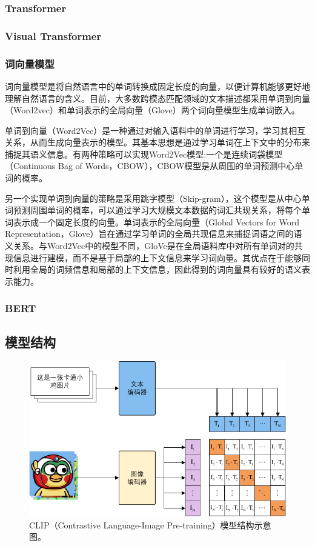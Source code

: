 \documentclass[a4paper]{zreport}
\begin{document}
\subsubsection{Transformer}

\subsubsection{Visual Transformer}

\subsubsection{词向量模型}

词向量模型是将自然语言中的单词转换成固定长度的向量，以便计算机能够更好地理解自然语言的含义。目前，大多数跨模态匹配领域的文本描述都采用单词到向量（Word2vec）和单词表示的全局向量（Glove）两个词向量模型生成单词嵌入。

单词到向量（Word2Vec）是一种通过对输入语料中的单词进行学习，学习其相互关系，从而生成向量表示的模型。其基本思想是通过学习单词在上下文中的分布来捕捉其语义信息。有两种策略可以实现Word2Vec模型:一个是连续词袋模型（Continuous Bag of Words，CBOW），CBOW模型是从周围的单词预测中心单词的概率。

另一个实现单词到向量的策略是采用跳字模型（Skip-gram），这个模型是从中心单词预测周围单词的概率，可以通过学习大规模文本数据的词汇共现关系，将每个单词表示成一个固定长度的向量。单词表示的全局向量（Global Vectors for Word Representation，Glove）旨在通过学习单词的全局共现信息来捕捉词语之间的语义关系。与Word2Vec中的模型不同，GloVe是在全局语料库中对所有单词对的共现信息进行建模，而不是基于局部的上下文信息来学习词向量。其优点在于能够同时利用全局的词频信息和局部的上下文信息，因此得到的词向量具有较好的语义表示能力。

\subsubsection{BERT}

\subsection{模型结构}

\begin{figure}[h]
\centering
\includegraphics[width=0.95\linewidth]{figures/clip1}
\caption{CLIP（Contrastive Language-Image Pre-training）模型结构示意图。}
\label{fig:clip1}
\end{figure}
\end{document}
